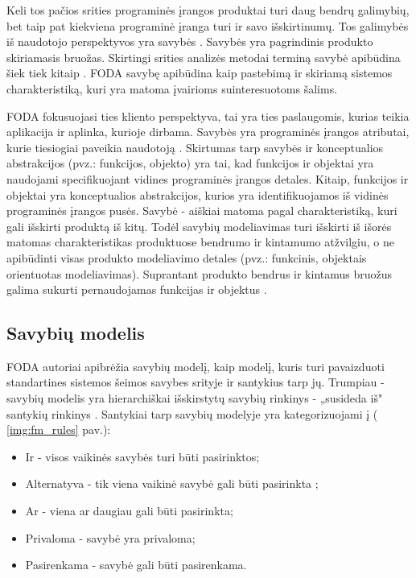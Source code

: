 \documentclass{VUMIFPSkursinis}
\begin{document}
Keli tos pačios srities programinės įrangos produktai turi daug bendrų galimybių, bet taip pat kiekviena programinė įranga turi ir savo išskirtinumų. Tos galimybės iš naudotojo perspektyvos yra savybės \cite{Kang1990}. Savybės yra pagrindinis produkto skiriamasis bruožas. Skirtingi srities analizės metodai terminą savybė apibūdina šiek tiek kitaip \cite{Lee2015}. FODA \cite{Kang1990} savybę apibūdina kaip pastebimą ir skiriamą sistemos charakteristiką, kuri yra matoma įvairioms suinteresuotoms šalims.

FODA fokusuojasi ties kliento perspektyva, tai yra ties paslaugomis, kurias teikia aplikacija ir aplinka, kurioje dirbama. Savybės yra programinės įrangos atributai, kurie tiesiogiai paveikia naudotoją \cite{Kang1990}. Skirtumas tarp savybės ir konceptualios abstrakcijos (pvz.: funkcijos, objekto) yra tai, kad funkcijos ir objektai yra naudojami specifikuojant vidines programinės įrangos detales. Kitaip, funkcijos ir objektai yra konceptualios abstrakcijos, kurios yra identifikuojamos iš vidinės programinės įrangos pusės. Savybė - aiškiai matoma  pagal charakteristiką, kuri gali išskirti produktą iš kitų. Todėl savybių modeliavimas turi išskirti iš išorės matomas charakteristikas produktuose bendrumo ir kintamumo atžvilgiu, o ne apibūdinti visas produkto modeliavimo detales (pvz.: funkcinis, objektais orientuotas modeliavimas). Suprantant produkto bendrus ir kintamus bruožus galima sukurti pernaudojamas funkcijas ir objektus \cite{Lee2015}.

\subsection{Savybių modelis}

FODA \cite{Kang1990} autoriai apibrėžia savybių modelį, kaip modelį, kuris turi pavaizduoti standartines sistemos šeimos savybes srityje ir santykius tarp jų. Trumpiau - savybių modelis yra hierarchiškai išskirstytų savybių rinkinys - „susideda iš" santykių rinkinys \cite{Kang1990, Batory2005}. Santykiai tarp savybių  modelyje yra kategorizuojami į ( \ref{img:fm_rules} pav.):
\begin{itemize}[topsep=0pt,itemsep=-1ex,partopsep=1ex,parsep=1ex]
\item Ir - visos vaikinės savybės turi būti pasirinktos;
\item Alternatyva - tik viena vaikinė savybė gali būti pasirinkta ;
\item Ar - viena ar daugiau gali būti pasirinkta;
\item Privaloma - savybė yra privaloma;
\item Pasirenkama - savybė gali būti pasirenkama.
\end{itemize}
\end{document}
